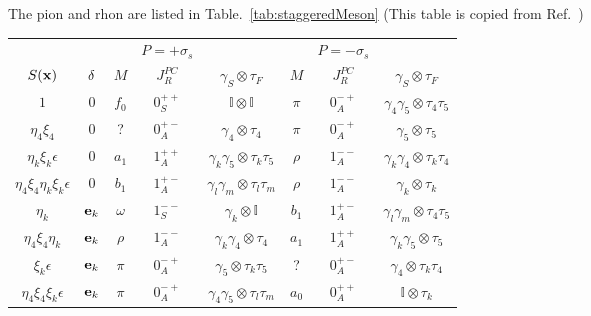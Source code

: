 The pion and rhon are listed in Table.~\ref{tab:staggeredMeson} (This table is copied from Ref.~\cite{staggeredMeson})
\begin{table}
\begin{center}
\begin{tabular}{c|c|ccc|ccc}
\hline
 & & & $P=+\sigma _s$ & & & $P=-\sigma _s$ & \\
$S({\bf x})$ & ${\bf \delta}$ & $M$ & $J^{PC}_R$ & $\gamma _S\otimes \tau _F$ & $M$ & $J^{PC}_R$ & $\gamma _S\otimes \tau _F$\\
\hline
$1$                                         & $0$                             & $f_0$    & $0^{++}_S$ & $\mathbb{I}\otimes \mathbb{I}$               & $\pi$    & $0^{-+}_A$ &  $\gamma_4\gamma _5\otimes \tau _4\tau _5$ \\
$\eta _4 \xi _4$                            & $0$                             & ?        & $0^{+-}_A$ & $\gamma _4 \otimes \tau _4$                  & $\pi$    & $0^{-+}_A$ &  $\gamma _5 \otimes \tau _5$ \\
$\eta _k \xi _k \epsilon$                   & $0$                             & $a_1$    & $1^{++}_A$ & $\gamma _k\gamma _5 \otimes \tau _k\tau _5$  & $\rho$   & $1^{--}_A$ &  $\gamma _k\gamma _4 \otimes \tau _k\tau _4$ \\
$\eta _4 \xi _4\eta _k \xi _k \epsilon$     & $0$                             & $b_1$    & $1^{+-}_A$ & $\gamma _l\gamma _m \otimes \tau _l\tau _m$  & $\rho$   & $1^{--}_A$ &  $\gamma _k \otimes \tau _k$ \\
$\eta _k$                                   & ${\bf e}_k$                     & $\omega$ & $1^{--}_S$ & $\gamma _k\otimes \mathbb{I}$                & $b_1$    & $1^{+-}_A$ & $\gamma _l\gamma _m\otimes \tau _4\tau _5$ \\
$\eta _4\xi _4\eta _k$                      & ${\bf e}_k$                     & $\rho$   & $1^{--}_A$ & $\gamma _k\gamma _4\otimes \tau _4$          & $a_1$    & $1^{++}_A$ & $\gamma _k\gamma _5\otimes \tau _5$ \\
$\xi _k\epsilon $                           & ${\bf e}_k$                     & $\pi$    & $0^{-+}_A$ & $\gamma _5 \otimes \tau _k\tau _5$           & ?        & $0^{+-}_A$ & $\gamma _4 \otimes \tau _k \tau _4$ \\
$\eta _4\xi_4\xi_k\epsilon$                 & ${\bf e}_k$                     & $\pi$    & $0^{-+}_A$ & $\gamma _4\gamma _5\otimes \tau _l \tau _m$  & $a_0$    & $0^{++}_A$ & $\mathbb{I}\otimes \tau _k$ \\

\end{tabular}
\end{center}
\end{table}
